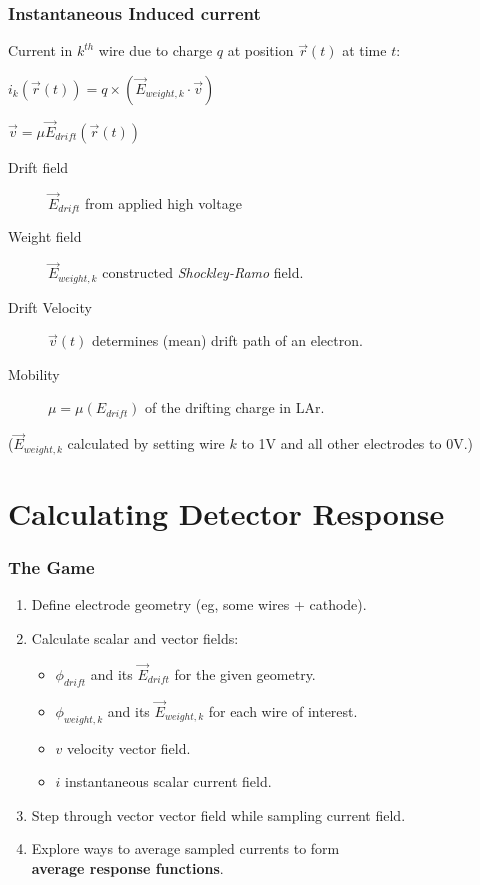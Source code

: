 \documentclass[xcolor=dvipsnames]{beamer}
\begin{document}
\begin{frame}
  \frametitle{Instantaneous Induced current}

  Current in $k^{th}$ wire due to charge $q$ at position $\vec{r}(t)$ at time $t$: \\
  \begin{center}
    $i_k(\vec{r}(t)) = q \times (\vec{E}_{weight,k} \cdot \vec{v})$      

    $\vec{v} = \mu \vec{E}_{drift}(\vec{r}(t))$ 
  \end{center}

  \begin{description}
  \item[Drift field] $\vec{E}_{drift}$ from applied high voltage
  \item[Weight field] $\vec{E}_{weight,k}$ constructed \textit{Shockley-Ramo} field.
  \item[Drift Velocity] $\vec{v}(t)$ determines (mean) drift path of an electron.
  \item[Mobility] $\mu = \mu(E_{drift})$ of the drifting charge in LAr.
  \end{description}

  \footnotesize
  ($\vec{E}_{weight,k}$ calculated by setting wire $k$ to 1V and all other electrodes to 0V.)

\end{frame}

\section{Calculating Detector Response}

\begin{frame}
  \frametitle{The Game}
  \begin{enumerate}
  \item Define electrode geometry (eg, some wires + cathode).
  \item Calculate scalar and vector fields:
    \begin{itemize}
    \item $\phi_{drift}$ and its $\vec{E}_{drift}$ for the given geometry.
    \item $\phi_{weight,k}$ and its $\vec{E}_{weight,k}$ for each wire of interest.
    \item $v$ velocity vector field.
    \item $i$ instantaneous scalar current field.
    \end{itemize}
  \item Step through vector vector field while sampling current field.
  \item Explore ways to average sampled currents to form \\
    \textbf{average response functions}.
  \end{enumerate}
\end{frame}
\end{document}
